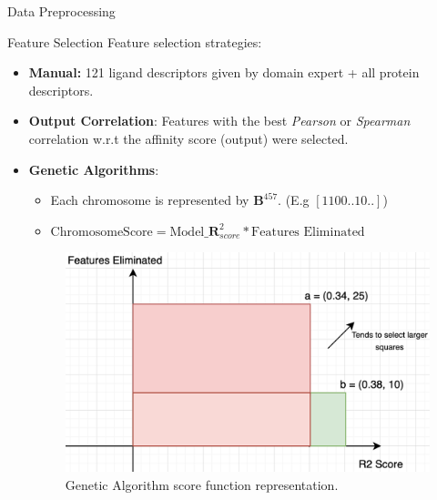 \documentclass{beamer}
\begin{document}
\begin{frame}[t]{Data Preprocessing}
\end{frame}

\begin{frame}[t]{Feature Selection}
Feature selection strategies:
\begin{itemize}
\item \textbf{Manual:} 121 ligand descriptors given by domain expert + all protein descriptors.
\item \textbf{Output Correlation}: Features with the best \textit{Pearson} or \textit{Spearman} correlation w.r.t the affinity score (output) were selected.
\item \textbf{Genetic Algorithms}:  \cite{geneticalgorithmsresearchpaper}
\begin{itemize}
\item Each chromosome is represented by $\mathbf{B}^{457}$.  (E.g $[1100..10..]$)
\item $\mathrm{Chromosome Score} = \mathrm{Model}\_\mathbf{R}^2_{score} * \textrm{Features Eliminated}$
\end{itemize}

\begin{figure}[htb]
  \centering
    \includegraphics[scale=0.25]{images/scoreFuntionMultiObject}
    \caption{Genetic Algorithm score function representation.}
    \label{fig:scorefunctionfigure}
\end{figure}

\end{itemize} 

\end{frame}
\end{document}

